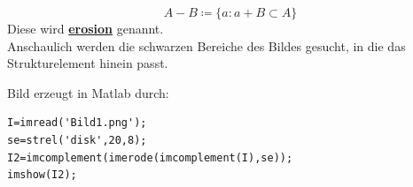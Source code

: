 \documentclass[ngerman]{article}
\theoremstyle{plain}
\theoremstyle{definition}
\numberwithin{equation}{section}
\newcommand{\mim}[1] {
\underline{\textbf{#1\index{#1}}}
}
\begin{document}
        \[A-B  \coloneqq  \{a : a + B \subset A\}\]
        Diese wird \mim{erosion} genannt.\\
        Anschaulich werden die schwarzen Bereiche des Bildes gesucht, in die das Strukturelement hinein passt.
        \begin{center}
        \end{center}

        Bild erzeugt in Matlab durch:\\
        \begin{lstlisting}
I=imread('Bild1.png');
se=strel('disk',20,8);
I2=imcomplement(imerode(imcomplement(I),se));
imshow(I2);
        \end{lstlisting}
\end{document}
